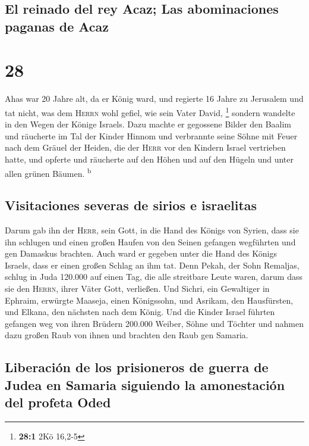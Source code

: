 \hypertarget{el-reinado-del-rey-acaz-las-abominaciones-paganas-de-acaz}{%
\subsection{El reinado del rey Acaz; Las abominaciones paganas de
Acaz}\label{el-reinado-del-rey-acaz-las-abominaciones-paganas-de-acaz}}

\hypertarget{section-27}{%
\section{28}\label{section-27}}

 Ahas war 20 Jahre alt, da er König ward, und regierte 16
Jahre zu Jerusalem und tat nicht, was dem \textsc{Herrn} wohl gefiel,
wie sein Vater David, \footnote{\textbf{28:1} 2Kö 16,2-5} 
sondern wandelte in den Wegen der Könige Israels. Dazu machte er
gegossene Bilder den Baalim  und räucherte im Tal der
Kinder Hinnom und verbrannte seine Söhne mit Feuer nach dem Gräuel der
Heiden, die der \textsc{Herr} vor den Kindern Israel vertrieben hatte,
 und opferte und räucherte auf den Höhen und auf den
Hügeln und unter allen grünen Bäumen. \textsuperscript{b}

\hypertarget{visitaciones-severas-de-sirios-e-israelitas}{%
\subsection{Visitaciones severas de sirios e
israelitas}\label{visitaciones-severas-de-sirios-e-israelitas}}

 Darum gab ihn der \textsc{Herr}, sein Gott, in die Hand
des Königs von Syrien, dass sie ihn schlugen und einen großen Haufen von
den Seinen gefangen wegführten und gen Damaskus brachten. Auch ward er
gegeben unter die Hand des Königs Israels, dass er einen großen Schlag
an ihm tat.  Denn Pekah, der Sohn Remaljas, schlug in Juda
120.000 auf einen Tag, die alle streitbare Leute waren, darum dass sie
den \textsc{Herrn}, ihrer Väter Gott, verließen.  Und
Sichri, ein Gewaltiger in Ephraim, erwürgte Maaseja, einen Königssohn,
und Asrikam, den Hausfürsten, und Elkana, den nächsten nach dem König.
 Und die Kinder Israel führten gefangen weg von ihren
Brüdern 200.000 Weiber, Söhne und Töchter und nahmen dazu großen Raub
von ihnen und brachten den Raub gen Samaria.

\hypertarget{liberaciuxf3n-de-los-prisioneros-de-guerra-de-judea-en-samaria-siguiendo-la-amonestaciuxf3n-del-profeta-oded}{%
\subsection{Liberación de los prisioneros de guerra de Judea en Samaria
siguiendo la amonestación del profeta
Oded}\label{liberaciuxf3n-de-los-prisioneros-de-guerra-de-judea-en-samaria-siguiendo-la-amonestaciuxf3n-del-profeta-oded}}

